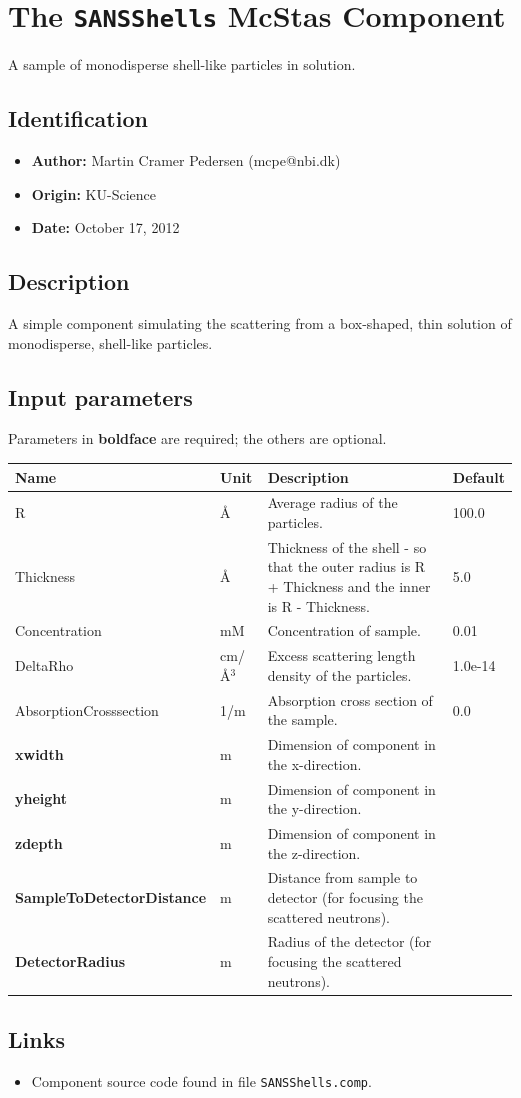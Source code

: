 \section{The \texttt{SANSShells} McStas Component}
A sample of monodisperse shell-like particles in solution.

\subsection*{Identification}
\begin{itemize}
  \item \textbf{Author:} Martin Cramer Pedersen (mcpe@nbi.dk)
  \item \textbf{Origin:} KU-Science
  \item \textbf{Date:} October 17, 2012
\end{itemize}

\subsection*{Description}
A simple component simulating the scattering from a box-shaped, thin solution of monodisperse, shell-like particles.

\subsection*{Input parameters}
Parameters in \textbf{boldface} are required; the others are optional.

\begin{longtable}{p{}p{}p{}p{}}
\toprule
\textbf{Name} & \textbf{Unit} & \textbf{Description} & \textbf{Default} \\
\midrule
\endhead
R & \AA{} & Average radius of the particles. & 100.0 \\
Thickness & \AA{} & Thickness of the shell - so that the outer radius is R + Thickness and the inner is R - Thickness. & 5.0 \\
Concentration & mM & Concentration of sample. & 0.01 \\
DeltaRho & cm/\AA{}$^{3}$ & Excess scattering length density of the particles. & 1.0e-14 \\
AbsorptionCrosssection & 1/m & Absorption cross section of the sample. & 0.0 \\
\textbf{xwidth} & m & Dimension of component in the x-direction. &  \\
\textbf{yheight} & m & Dimension of component in the y-direction. &  \\
\textbf{zdepth} & m & Dimension of component in the z-direction. &  \\
\textbf{SampleToDetectorDistance} & m & Distance from sample to detector (for focusing the scattered neutrons). &  \\
\textbf{DetectorRadius} & m & Radius of the detector (for focusing the scattered neutrons). &  \\
\bottomrule
\end{longtable}

\subsection*{Links}
\begin{itemize}
  \item Component source code found in file \texttt{SANSShells.comp}.
\end{itemize}
